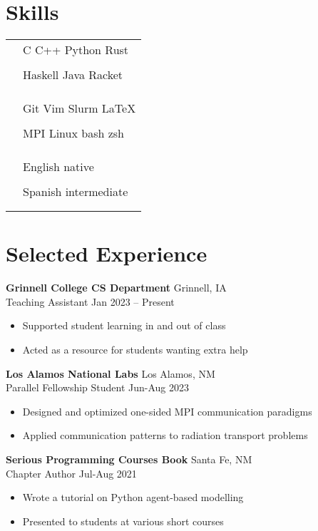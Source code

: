 \documentclass[12pt]{article}
\newcommand{\entry}[4]{{{\textbf{#1}}} \hfill #3 \\ #2 \hfill #4}
\newcommand{\tableentry}[3]{\textsc{#1} & #2\expandafter\ifstrequal\expandafter{#3}{}{\\}{\\[6pt]}}
\begin{document}
\begin{paracol}{2}
\switchcolumn{}

\section{Skills}
\begin{supertabular}{rl}
	\tableentry{\footnotesize\faCode}{C \textperiodcentered{} C++ \textperiodcentered{} Python \textperiodcentered{} Rust}{}
	\tableentry{}{Haskell \textperiodcentered{} Java \textperiodcentered{} Racket}{}
  \tableentry{}{}{}

  \tableentry{\footnotesize\faWrench}{Git \textperiodcentered{} Vim \textperiodcentered{} Slurm \textperiodcentered{} LaTeX}{}
	\tableentry{}{MPI \textperiodcentered{} Linux \textperiodcentered{} bash \textperiodcentered{} zsh}{}
  \tableentry{}{}{}

  \tableentry{\footnotesize\faLanguage}{English \textperiodcentered{} native}{}
  \tableentry{}{Spanish \textperiodcentered{} intermediate}{}
\end{supertabular}

\switchcolumn*

\section{Selected Experience}

\entry{Grinnell College CS Department}{Teaching Assistant}{Grinnell, IA}{Jan 2023 -- Present}
\begin{itemize}[noitemsep,leftmargin=3.5mm,rightmargin=0mm,topsep=6pt]
  \item Supported student learning in and out of class
  \item Acted as a resource for students wanting extra help
\end{itemize}

\medskip

\entry{Los Alamos National Labs}{Parallel Fellowship Student}{Los Alamos, NM}{Jun-Aug 2023}
\begin{itemize}[noitemsep,leftmargin=3.5mm,rightmargin=0mm,topsep=6pt]
  \item Designed and optimized one-sided MPI communication paradigms
  \item Applied communication patterns to radiation transport problems
\end{itemize}

\medskip

\entry{Serious Programming Courses Book}{Chapter Author}{Santa Fe, NM}{Jul-Aug 2021}
\begin{itemize}[noitemsep,leftmargin=3.5mm,rightmargin=0mm,topsep=6pt]
  \item Wrote a tutorial on Python agent-based modelling
  \item Presented to students at various short courses
\end{itemize}


\end{paracol}
\end{document}
